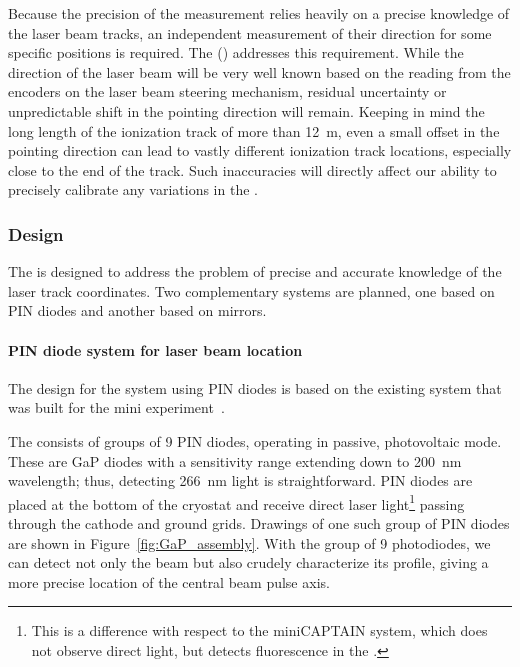 
Because the precision of the \efield measurement relies heavily on a precise knowledge of the laser beam tracks, an independent measurement of their direction for some specific positions is required. The  () addresses this requirement. 
While the direction of the laser beam will be very well known based on the reading from the encoders on the laser beam steering mechanism,  residual uncertainty or unpredictable shift in the pointing direction will remain. 
Keeping in mind the long length of the ionization track of more than \SI{12}{\m}, even a small offset in the pointing direction can lead to vastly different ionization track locations, especially close to the end of the track. Such inaccuracies will directly affect our ability to precisely calibrate any variations in the \efield.

\subsubsection{Design}
The  is designed to address the problem of precise and accurate knowledge of the laser track coordinates. 
Two complementary systems are planned, one based on PIN diodes and another based on mirrors.

\paragraph{PIN diode system for laser beam location}
The design for the system using PIN diodes is based on the existing system that was built for the mini experiment~\cite{Berns:2013usa}.

The  consists of groups of \num{9} PIN diodes, operating in passive, photovoltaic mode. These are GaP diodes with a sensitivity range extending down to  \SI{200}{\nano\m} wavelength; thus, detecting \SI{266}{\nano\m} light is straightforward. %
PIN diodes are placed at the bottom of the cryostat and receive direct laser light\footnote{This is a difference with respect to the miniCAPTAIN system, which does not observe direct light, but detects fluorescence in the \frfour.} passing through the cathode and ground grids. Drawings of one such group of PIN diodes are shown in Figure~\ref{fig:GaP_assembly}. With the group of \num{9} photodiodes, we can detect not only the beam but also crudely characterize its profile, giving a more precise location of the central beam pulse axis. 

